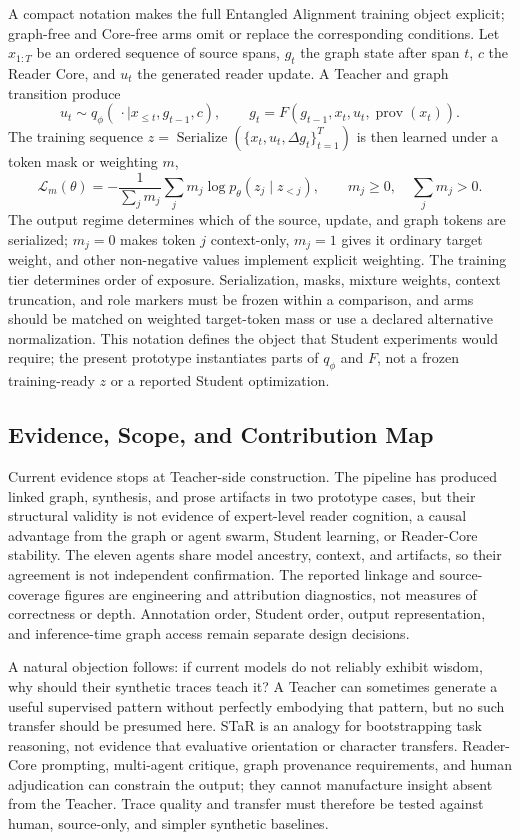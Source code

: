 \documentclass[11pt]{article}
\begin{document}
\begin{samepage}
A compact notation makes the full Entangled Alignment training object explicit;
graph-free and Core-free arms omit or replace the corresponding conditions. Let
$x_{1:T}$ be an ordered sequence of source spans, $g_t$ the graph state after
span $t$, $c$ the Reader Core, and $u_t$ the generated reader update. A Teacher
and graph transition produce
\[
u_t \sim q_\phi(\,\cdot\mid x_{\leq t},g_{t-1},c), \qquad
g_t=F\!\left(g_{t-1},x_t,u_t,\operatorname{prov}(x_t)\right).
\]
The training sequence $z=\operatorname{Serialize}(\{x_t,u_t,\Delta
g_t\}_{t=1}^T)$ is then learned under a token mask or weighting $m$,
\[
\mathcal{L}_m(\theta)
=-\frac{1}{\sum_j m_j}\sum_j m_j\log p_\theta(z_j\mid z_{<j}),
\qquad m_j\geq 0,\quad \sum_j m_j>0.
\]
The output regime determines which of the source, update, and graph tokens are
serialized; $m_j=0$ makes token $j$ context-only, $m_j=1$ gives it ordinary
target weight, and other non-negative values implement explicit weighting. The
training tier determines order of exposure. Serialization, masks, mixture
weights, context truncation, and role markers must be frozen within a
comparison, and arms should be matched on weighted target-token mass or use a
declared alternative normalization. This notation defines the object that
Student experiments would require; the present prototype instantiates parts of
$q_\phi$ and $F$, not a frozen training-ready $z$ or a reported Student
optimization.
\end{samepage}

\subsection{Evidence, Scope, and Contribution Map}\label{sec:contributions}

Current evidence stops at Teacher-side construction. The pipeline has produced
linked graph, synthesis, and prose artifacts in two prototype cases, but their
structural validity is not evidence of expert-level reader cognition, a causal
advantage from the graph or agent swarm, Student learning, or Reader-Core
stability. The eleven agents share model ancestry, context, and artifacts, so
their agreement is not independent confirmation. The reported linkage and
source-coverage figures are engineering and attribution diagnostics, not
measures of correctness or depth. Annotation order, Student order, output
representation, and inference-time graph access remain separate design
decisions.

A natural objection follows: if current models do not reliably exhibit wisdom,
why should their synthetic traces teach it? A Teacher can sometimes generate a
useful supervised pattern without perfectly embodying that pattern, but no such
transfer should be presumed here. STaR \cite{zelikman2022star} is an analogy for
bootstrapping task reasoning, not evidence that evaluative orientation or
character transfers. Reader-Core prompting, multi-agent critique, graph
provenance requirements, and human adjudication can constrain the output; they
cannot manufacture insight absent from the Teacher. Trace quality and transfer
must therefore be tested against human, source-only, and simpler synthetic
baselines.
\end{document}
